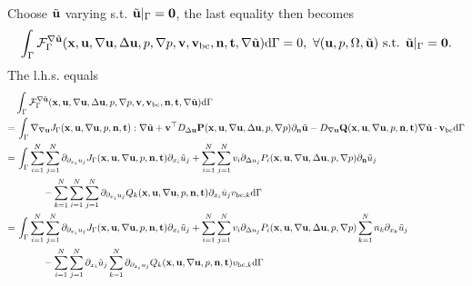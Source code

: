 \documentclass[oneside,11pt]{book}
\numberwithin{equation}{section}
\begin{document}
\begin{itemize}[leftmargin=0in]
\begin{itemize}
\begin{align*}
        \end{align*}
        Choose $\tilde{\bf u}$ varying s.t. $\tilde{\bf u}|_\Gamma = {\bf 0}$, the last equality then becomes
        \begin{align*}
            \int_\Gamma \mathcal{F}_\Gamma^{\nabla\tilde{\bf u}}({\bf x},{\bf u},\nabla{\bf u},\Delta{\bf u},p,\nabla p,{\bf v},{\bf v}_{\rm bc},{\bf n},{\bf t},\nabla\tilde{\bf u}){\rm d}\Gamma = 0,\ \forall({\bf u},p,\Omega,\tilde{\bf u}) \mbox{ s.t. } \tilde{\bf u}|_\Gamma = {\bf 0}.
        \end{align*}    
        The l.h.s. equals
        \begin{align*}
            &\int_\Gamma \mathcal{F}_\Gamma^{\nabla\tilde{\bf u}}({\bf x},{\bf u},\nabla{\bf u},\Delta{\bf u},p,\nabla p,{\bf v},{\bf v}_{\rm bc},{\bf n},{\bf t},\nabla\tilde{\bf u}){\rm d}\Gamma\\
            =&\, \int_\Gamma \nabla_{\nabla{\bf u}}J_\Gamma({\bf x},{\bf u},\nabla{\bf u},p,{\bf n},{\bf t}):\nabla\tilde{\bf u} + {\bf v}^\top D_{\Delta{\bf u}}{\bf P}({\bf x},{\bf u},\nabla{\bf u},\Delta{\bf u},p,\nabla p)\partial_{\bf n}\tilde{\bf u} - D_{\nabla{\bf u}}{\bf Q}({\bf x},{\bf u},\nabla{\bf u},p,{\bf n},{\bf t})\nabla\tilde{\bf u}\cdot{\bf v}_{\rm bc}{\rm d}\Gamma\\
            =&\, \int_\Gamma \sum_{i=1}^N\sum_{j=1}^N \partial_{\partial_{x_i}u_j}J_\Gamma({\bf x},{\bf u},\nabla{\bf u},p,{\bf n},{\bf t})\partial_{x_i}\tilde{u}_j + \sum_{i=1}^N\sum_{j=1}^N v_i\partial_{\Delta u_j}P_i({\bf x},{\bf u},\nabla{\bf u},\Delta{\bf u},p,\nabla p)\partial_{\bf n}\tilde{u}_j\\
            &\hspace{1cm}- \sum_{k=1}^N\sum_{i=1}^N\sum_{j=1}^N \partial_{\partial_{x_i}u_j}Q_k({\bf x},{\bf u},\nabla{\bf u},p,{\bf n},{\bf t})\partial_{x_i}\tilde{u}_jv_{{\rm bc},k}{\rm d}\Gamma\\
            =&\, \int_\Gamma \sum_{i=1}^N\sum_{j=1}^N \partial_{\partial_{x_i}u_j}J_\Gamma({\bf x},{\bf u},\nabla{\bf u},p,{\bf n},{\bf t})\partial_{x_i}\tilde{u}_j + \sum_{i=1}^N\sum_{j=1}^N v_i\partial_{\Delta u_j}P_i({\bf x},{\bf u},\nabla{\bf u},\Delta{\bf u},p,\nabla p)\sum_{k=1}^N n_k\partial_{x_k}\tilde{u}_j\\
            &\hspace{1cm}- \sum_{i=1}^N\sum_{j=1}^N \partial_{x_i}\tilde{u}_j\sum_{k=1}^N\partial_{\partial_{x_i}u_j}Q_k({\bf x},{\bf u},\nabla{\bf u},p,{\bf n},{\bf t})v_{{\rm bc},k}{\rm d}\Gamma\\

\end{align*}
\end{itemize}
\end{itemize}
\end{document}
